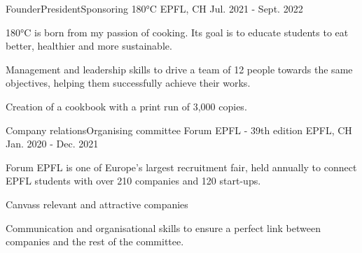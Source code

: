 

\begin{cventries}

  \cventry
    {Founder{\quad\textbar\quad}President{\quad\textbar\quad}Sponsoring} %
    {180°C} %
    {EPFL, CH} %
    {Jul. 2021 - Sept. 2022} %
    {
      \begin{cvitems} %
        \item 180°C is born from my passion of cooking. Its goal is to educate students to eat better, healthier and more sustainable.
        \item Management and leadership skills to drive a team of 12 people towards the same objectives, helping them successfully achieve their works.
        \item Creation of a cookbook with a print run of 3,000 copies.
      \end{cvitems}
    }

  \cventry
    {Company relations{\quad\textbar\quad}Organising committee} %
    {Forum EPFL - 39th edition} %
    {EPFL, CH} %
    {Jan. 2020 - Dec. 2021} %
    {
      \begin{cvitems} %
        \item Forum EPFL is one of Europe's largest recruitment fair, held annually to connect EPFL students with over 210 companies and 120 start-ups.
        \item Canvass relevant and attractive companies
        \item Communication and organisational skills to ensure a perfect link between companies and the rest of the committee.
      \end{cvitems}
    }
  

\end{cventries}
